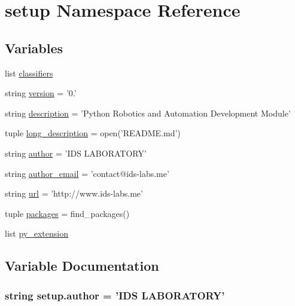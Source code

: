 \hypertarget{namespacesetup}{}\section{setup Namespace Reference}
\label{namespacesetup}
\subsection*{Variables}
\begin{DoxyCompactItemize}
\item 
list \hyperlink{namespacesetup_aa6d1b3ef82314b74854a1a1a473aadbf}{classifiers}
\item 
string \hyperlink{namespacesetup_a8b86ddd5b5591d99de08e584197a53d9}{version} = '0.'
\item 
string \hyperlink{namespacesetup_a4ad612547892c74be7035043265eb65c}{description} = 'Python Robotics and Automation Development Module'
\item 
tuple \hyperlink{namespacesetup_a2e8655c91c2658305ee0ee4c023d59eb}{long\+\_\+description} = open('R\+E\+A\+D\+M\+E.\+md')
\item 
string \hyperlink{namespacesetup_a7b92894168460f935bc49467954c4a92}{author} = 'I\+D\+S L\+A\+B\+O\+R\+A\+T\+O\+R\+Y'
\item 
string \hyperlink{namespacesetup_a4ead8e1ca45242906fde7d5489f3beaa}{author\+\_\+email} = 'contact@ids-\/labs.\+me'
\item 
string \hyperlink{namespacesetup_a7c3763764f99123690822c047e74c36e}{url} = 'http\+://www.\+ids-\/labs.\+me'
\item 
tuple \hyperlink{namespacesetup_a61c4df0a151113447498726d453324de}{packages} = find\+\_\+packages()
\item 
list \hyperlink{namespacesetup_af0c0e6d309529d5ba05aa1b7bf922b4f}{py\+\_\+extension}
\end{DoxyCompactItemize}


\subsection{Variable Documentation}
\hypertarget{namespacesetup_a7b92894168460f935bc49467954c4a92}{}
\subsubsection[{author}]{\setlength{\rightskip}{0pt plus 5cm}string setup.\+author = 'I\+D\+S L\+A\+B\+O\+R\+A\+T\+O\+R\+Y'}\label{namespacesetup_a7b92894168460f935bc49467954c4a92}
\hypertarget{namespacesetup_a4ead8e1ca45242906fde7d5489f3beaa}{}
